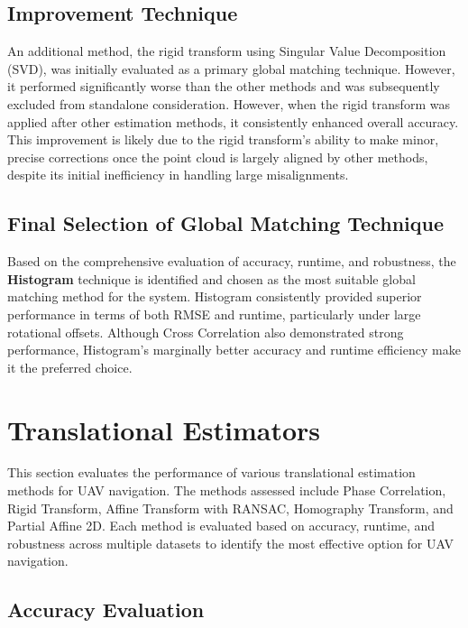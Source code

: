 \subsection{Improvement Technique}

An additional method, the rigid transform using Singular Value Decomposition (SVD), was initially evaluated as a primary global matching technique. However, it performed significantly worse than the other methods and was subsequently excluded from standalone consideration. However, when the rigid transform was applied after other estimation methods, it consistently enhanced overall accuracy. This improvement is likely due to the rigid transform's ability to make minor, precise corrections once the point cloud is largely aligned by other methods, despite its initial inefficiency in handling large misalignments.

\subsection{Final Selection of Global Matching Technique}

Based on the comprehensive evaluation of accuracy, runtime, and robustness, the \textbf{Histogram} technique is identified and chosen as the most suitable global matching method for the system. Histogram consistently provided superior performance in terms of both RMSE and runtime, particularly under large rotational offsets. Although Cross Correlation also demonstrated strong performance, Histogram's marginally better accuracy and runtime efficiency make it the preferred choice.



\section{Translational Estimators}

This section evaluates the performance of various translational estimation methods for UAV navigation. The methods assessed include Phase Correlation, Rigid Transform, Affine Transform with RANSAC, Homography Transform, and Partial Affine 2D. Each method is evaluated based on accuracy, runtime, and robustness across multiple datasets to identify the most effective option for UAV navigation.

\subsection{Accuracy Evaluation}

